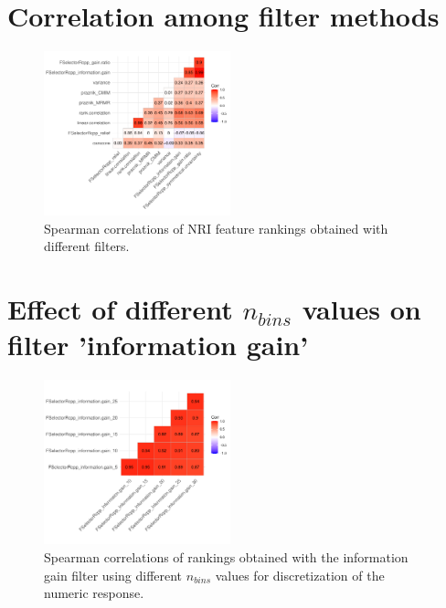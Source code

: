 \documentclass[peerreview]{IEEEtran}
\begin{document}
\section{Correlation among filter methods}

\begin{figure} [ht]
	\begin{center}
		\includegraphics[width=0.48\textwidth] {correlation-filter-nri-1.pdf}
		\caption{Spearman correlations of NRI feature rankings obtained with different filters.}\label{fig:correlation-filters}
	\end{center}
\end{figure}

\section{Effect of different \texorpdfstring{\(n_{bins}\)}{nbins} values on filter 'information gain'}

\begin{figure} [ht]
	\begin{center}
		\includegraphics[width=0.48\textwidth] {correlation-nbins-1.pdf}
		\caption{Spearman correlations of rankings obtained with the information gain filter using different \texttt{\(n_{bins}\)} values for discretization of the numeric response.}\label{fig:correlation-nbins}
	\end{center}
\end{figure}
\end{document}
